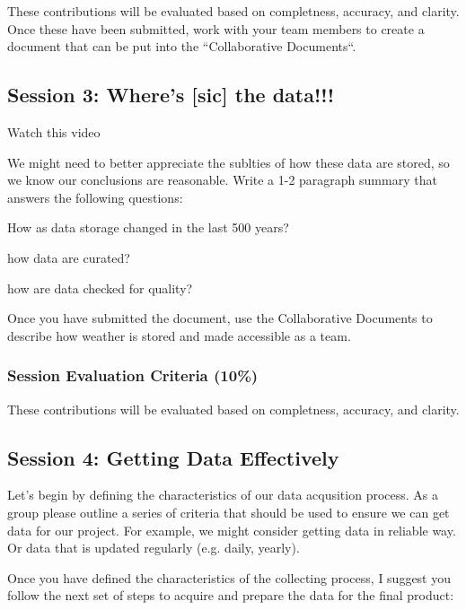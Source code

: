 \documentclass{article}\usepackage[]{graphicx}\usepackage[]{color}
\newenvironment{enumerate*}%
  {\begin{enumerate}%
    \setlength{\itemsep}{0pt}%
    \setlength{\parskip}{0pt}}%
  {\end{enumerate}}
\begin{document}
These contributions will be evaluated based on completness, accuracy, and clarity. Once these have been submitted, work with your team members to create a document that can be put into the ``Collaborative Documents``.

\subsection{Session 3: Where's [sic] the data!!!}

Watch this video

We might need to better appreciate the sublties of how these data are stored, so we know our conclusions are reasonable. Write a 1-2 paragraph summary that answers the following questions: 

\begin{enumerate*}
  \item How as data storage changed in the last 500 years?
  \item how data are curated? 
  \item how are data checked for quality?
\end{enumerate*}

Once you have submitted the document, use the Collaborative Documents to describe how weather is stored and made accessible as a team. 

\subsubsection{Session Evaluation Criteria (10\%)}

These contributions will be evaluated based on completness, accuracy, and clarity. 

\subsection{Session 4: Getting Data Effectively}

Let's begin by defining the characteristics of our data acqusition process. As a group please outline a series of criteria that should be used to ensure we can get data for our project. For example, we might consider getting data in reliable way. Or data that is updated regularly (e.g. daily, yearly).

Once you have defined the characteristics of the collecting process, I suggest you follow the next set of steps to acquire and prepare the data for the final product:
\end{document}
